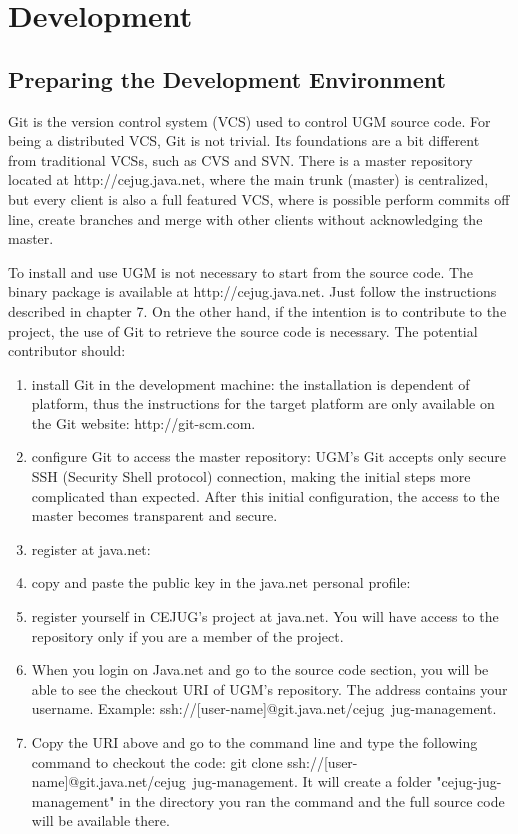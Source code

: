 \documentclass[envcountsame,envcountchap]{svmono}
\begin{document}
\chapter{Development}

\section{Preparing the Development Environment}

Git is the version control system (VCS) used to control UGM source code. For being a distributed VCS, Git is not trivial. Its foundations are a bit different from traditional VCSs, such as CVS and SVN. There is a master repository located at http://cejug.java.net, where the main trunk (master) is centralized, but every client is also a full featured VCS, where is possible perform commits off line, create branches and merge with other clients without acknowledging the master.

To install and use UGM is not necessary to start from the source code. The binary package is available at http://cejug.java.net. Just follow the instructions described in chapter 7. On the other hand, if the intention is to contribute to the project, the use of Git to retrieve the source code is necessary. The potential contributor should:

\begin{enumerate}
\item install Git in the development machine: the installation is dependent of platform, thus the instructions for the target platform are only available on the Git website: http://git-scm.com.
\item configure Git to access the master repository: UGM's Git accepts only secure SSH (Security Shell protocol) connection, making the initial steps more complicated than expected. After this initial configuration, the access to the master becomes transparent and secure.
\item register at java.net:
\item copy and paste the public key in the java.net personal profile:
\item register yourself in CEJUG's project at java.net. You will have access to the repository only if you are a member of the project.
\item When you login on Java.net and go to the source code section, you will be able to see the checkout URI of UGM's repository. The address contains your username. Example: ssh://[user-name]@git.java.net/cejug~jug-management.
\item Copy the URI above and go to the command line and type the following command to checkout the code: git clone ssh://[user-name]@git.java.net/cejug~jug-management. It will create a folder "cejug-jug-management" in the directory you ran the command and the full source code will be available there.
\end{enumerate}
\end{document}
